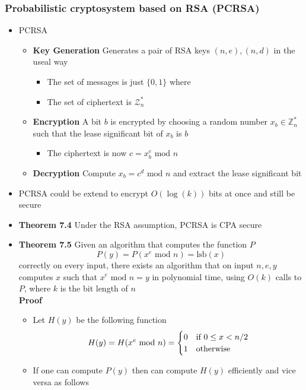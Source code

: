\subsubsection{Probabilistic cryptosystem based on RSA (PCRSA)}
\begin{itemize}
  \item PCRSA
  \begin{itemize}
  	\item \textbf{Key Generation} Generates a pair of RSA keys $(n,e), (n,d)$ in the useal way
    \begin{itemize}
  		\item The set of messages is just $\{0,1\}$ where
  		\item The set of ciphertext is $\mathcal Z_n^*$
    \end{itemize}
  	\item \textbf{Encryption} A bit $b$ is encrypted by choosing a random number $x_b \in \mathbb Z_n^*$ such that the lease significant bit of $x_b$ is $b$
    \begin{itemize}
  		\item The ciphertext is now $c = x_b^e \text{ mod } n$
    \end{itemize}
  	\item \textbf{Decryption} Compute $x_b = c^d \text{ mod } n$ and extract the lease significant bit
  \end{itemize}
  \item PCRSA could be extend to encrypt $O(\log(k))$ bits at once and still be secure
  \item \textbf{Theorem 7.4} Under the RSA assumption, PCRSA is CPA secure
  \item \textbf{Theorem 7.5} Given an algorithm that computes the function $P$
  \[
    P(y) = P(x^e \text{ mod } n ) = \text{lsb}(x)
  \]
  correctly on every input, there exists an algorithm that on input $n,e,y$ computes $x$ such that $x^e \text{ mod } n = y$ in polynomial time, using $O(k)$ calls to $P$, where $k$ is the bit length of $n$ \smallskip \\
  \textbf{Proof}
  \begin{itemize}
  	\item Let $H(y)$ be the following function
    \[
    H(y) = H(x^e \text{ mod } n) =
    \begin{cases} 
      0 & \text{if } 0 \leq x < n/2 \\
      1 & \text{otherwise}
    \end{cases}
    \]
    \item If one can compute $P(y)$ then can compute $H(y)$ efficiently and vice versa as follows

\end{itemize}
\end{itemize}
